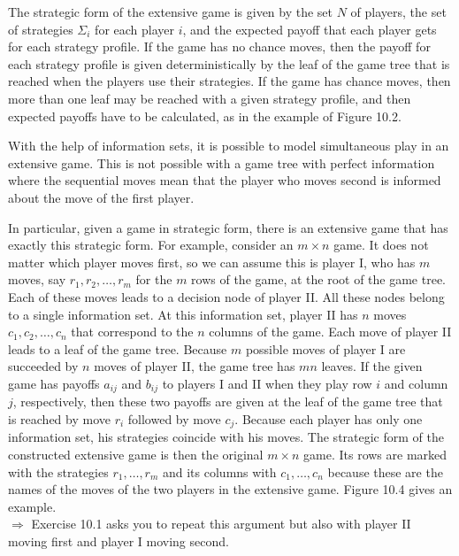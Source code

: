 \documentclass[12pt]{article}
\begin{document}
The strategic form of the extensive game is given by the set $N$ of players, the set of strategies $\Sigma_{i}$ for each player $i$, and the expected payoff that each player gets for each strategy profile. If the game has no chance moves, then the payoff for each strategy profile is given deterministically by the leaf of the game tree that is reached when the players use their strategies. If the game has chance moves, then more than one leaf may be reached with a given strategy profile, and then expected payoffs have to be calculated, as in the example of Figure 10.2.

With the help of information sets, it is possible to model simultaneous play in an extensive game. This is not possible with a game tree with perfect information where the sequential moves mean that the player who moves second is informed about the move of the first player.

In particular, given a game in strategic form, there is an extensive game that has exactly this strategic form. For example, consider an $m \times n$ game. It does not matter which player moves first, so we can assume this is player I, who has $m$ moves, say $r_{1}, r_{2}, \ldots, r_{m}$ for the $m$ rows of the game, at the root of the game tree. Each of these moves leads to a decision node of player II. All these nodes belong to a single information set. At this information set, player II has $n$ moves $c_{1}, c_{2}, \ldots, c_{n}$ that correspond to the $n$ columns of the game. Each move of player II leads to a leaf of the game tree. Because $m$ possible moves of player I are succeeded by $n$ moves of player II, the game tree has $m n$ leaves. If the given game has payoffs $a_{i j}$ and $b_{i j}$ to players I and II when they play row $i$ and column $j$, respectively, then these two payoffs are given at the leaf of the game tree that is reached by move $r_{i}$ followed by move $c_{j}$. Because each player has only one information set, his strategies coincide with his moves. The strategic form of the constructed extensive game is then the original $m \times n$ game. Its rows are marked with the strategies $r_{1}, \ldots, r_{m}$ and its columns with $c_{1}, \ldots, c_{n}$ because these are the names of the moves of the two players in the extensive game. Figure 10.4 gives an example.\\
$\Rightarrow$ Exercise 10.1 asks you to repeat this argument but also with player II moving first and player I moving second.
\end{document}
